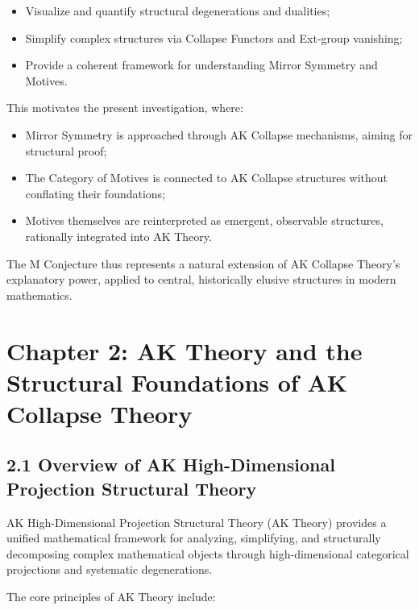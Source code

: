 \documentclass[11pt]{article}
\begin{document}
\begin{itemize}
    \item Visualize and quantify structural degenerations and dualities;
    \item Simplify complex structures via Collapse Functors and Ext-group vanishing;
    \item Provide a coherent framework for understanding Mirror Symmetry and Motives.
\end{itemize}

This motivates the present investigation, where:

\begin{itemize}
    \item Mirror Symmetry is approached through AK Collapse mechanisms, aiming for structural proof;
    \item The Category of Motives is connected to AK Collapse structures without conflating their foundations;
    \item Motives themselves are reinterpreted as emergent, observable structures, rationally integrated into AK Theory.
\end{itemize}

The M Conjecture thus represents a natural extension of AK Collapse Theory's explanatory power, applied to central, historically elusive structures in modern mathematics.

\FloatBarrier




\section{Chapter 2: AK Theory and the Structural Foundations of AK Collapse Theory}

\subsection{2.1 Overview of AK High-Dimensional Projection Structural Theory}

AK High-Dimensional Projection Structural Theory (AK Theory) provides a unified mathematical framework for analyzing, simplifying, and structurally decomposing complex mathematical objects through high-dimensional categorical projections and systematic degenerations.

The core principles of AK Theory include:
\end{document}
